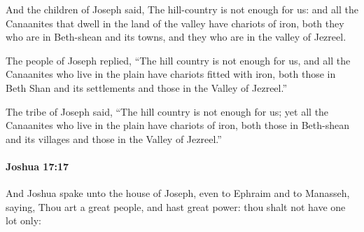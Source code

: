 			\begin{versebox}
					\item[BHS] 
					\item[ASV] And the children of Joseph said, The hill-country is not enough for us: and all the Canaanites that dwell in the land of the valley have chariots of iron, both they who are in Beth-shean and its towns, and they who are in the valley of Jezreel.
					\item[NIV] The people of Joseph replied, “The hill country is not enough for us, and all the Canaanites who live in the plain have chariots fitted with iron, both those in Beth Shan and its settlements and those in the Valley of Jezreel.”
					\item[NRSV] The tribe of Joseph said, “The hill country is not enough for us; yet all the Canaanites who live in the plain have chariots of iron, both those in Beth-shean and its villages and those in the Valley of Jezreel.”
			\end{versebox}

		\paragraph{Joshua 17:17} %
			\label{JOSHUA-17-17}

			And Joshua spake unto the house of Joseph, even to Ephraim and to Manasseh, saying, Thou art a great people, and hast great power: thou shalt not have one lot only:

